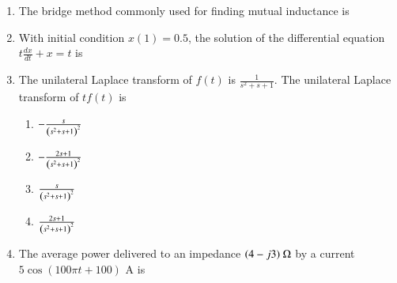 \documentclass[journal,12pt,onecolumn]{IEEEtran}
\theoremstyle{remark}
\begin{document}
\begin{enumerate}[start=1, label=Q.\arabic*]
\item The bridge method commonly used for finding mutual inductance is

\begin{enumerate}
\end{enumerate}
\hfill{}

\item With initial condition $x(1)=0.5$, the solution of the differential equation $t\frac{dx}{dt}+x=t$ is

\begin{enumerate}
\end{enumerate}
\hfill{}

\item The unilateral Laplace transform of $f(t)$ is $\frac{1}{s^{2}+s+1}$. The unilateral Laplace transform of $t f(t)$ is

\begin{enumerate}
    \item $-\frac{s}{\left(s^{2}+s+1\right)^{2}}$
    \item $-\frac{2s+1}{\left(s^{2}+s+1\right)^{2}}$
    \item $\frac{s}{\left(s^{2}+s+1\right)^{2}}$
    \item $\frac{2s+1}{\left(s^{2}+s+1\right)^{2}}$
\end{enumerate}
\hfill{}

\item The average power delivered to an impedance $(4-j3)~\ohm$ by a current $5\cos(100\pi t+100)$ A is

\begin{enumerate}
\end{enumerate}
\hfill{}


\end{enumerate}
\end{document}
